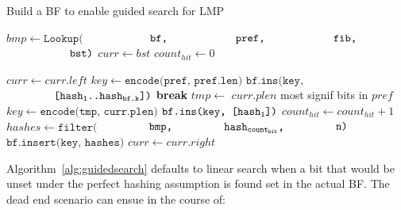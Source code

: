 \documentclass[conference,compsoc]{IEEEtran}
\begin{document}
\begin{algorithm}
  \caption{Build a BF to enable guided search for LMP}\label{alg:build}
  \begin{algorithmic}[1]


    \State $bmp \gets \texttt{Lookup(}$
        \State $\hspace*{20mm} \texttt{bf,}$
        \State $\hspace*{20mm} \texttt{pref,}$
        \State $\hspace*{20mm} \texttt{fib,}$
        \State $\hspace*{20mm} \texttt{bst)}$
    \State $curr \gets bst$
    \State $count_{hit} \gets 0$


        \State $curr \gets curr.left$
        \State $key \gets \texttt{encode(pref, pref.len)}$
        \State $\texttt{bf.ins(key,}$
                \State $\hspace*{15mm} \texttt{[hash\textsubscript{1}..hash\textsubscript{bf.k}])}$
        \State \textbf{break}
      \Else
        \State $tmp \gets$ $curr.plen$ most signif bits in $pref$
        \State $key \gets \texttt{encode(tmp, curr.plen)}$
        \State $\texttt{bf.ins(key, [hash\textsubscript{1}])}$
        \State $count_{hit} \gets count_{hit} + 1$
        \State $hashes \gets \texttt{filter(}$
              \State $\hspace*{15mm} \texttt{bmp,}$
              \State $\hspace*{15mm} \texttt{hash\textsubscript{count\textsubscript{hit}},}$
              \State $\hspace*{15mm} \texttt{n)}$
        \State $\texttt{bf.insert(key, hashes)}$
        \State $curr \gets curr.right$
      \EndIf
    \EndWhile
    \EndProcedure

  \end{algorithmic}
\end{algorithm}


Algorithm~\ref{alg:guidedsearch} defaults to linear search when a bit that
would be unset
under the perfect hashing assumption is found set in the actual BF.
The dead end scenario can ensue in the course of:
\end{document}
